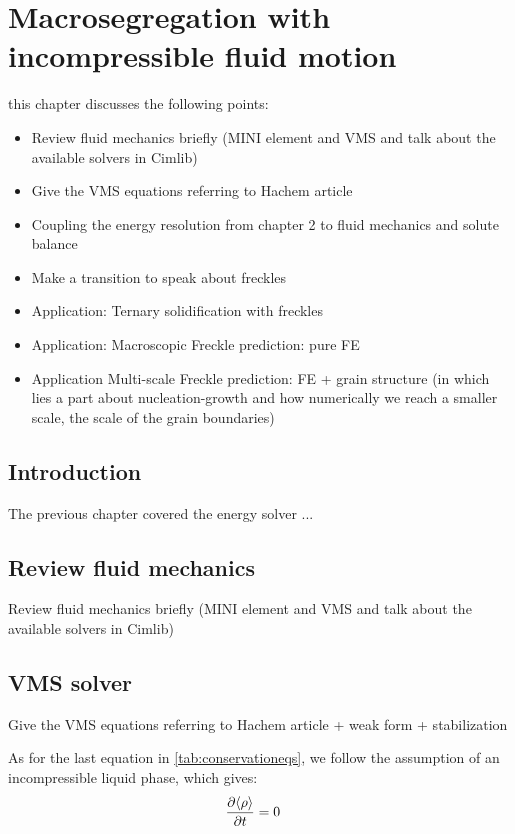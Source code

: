 \chapter{Macrosegregation with incompressible fluid motion}
\begin{nolinkcolors} 
\minitoc
\end{nolinkcolors}
\newpage

this chapter discusses the following points:
\begin{itemize}
\item Review fluid mechanics briefly (MINI element and VMS and talk about the available solvers in Cimlib)
\item Give the VMS equations referring to Hachem article
\item Coupling the energy resolution from chapter 2 to fluid mechanics and solute balance
\item Make a transition to speak about freckles
\item Application: Ternary solidification with freckles
\item Application: Macroscopic Freckle prediction: pure FE
\item Application Multi-scale Freckle prediction: FE + grain structure (in which lies a part about nucleation-growth and how numerically 
		we reach a smaller scale, the scale of the grain boundaries)
\end{itemize}

\section{Introduction}
The previous chapter covered the energy solver ...

\section{Review fluid mechanics}
Review fluid mechanics briefly (MINI element and VMS and talk about the available solvers in Cimlib)

\section{VMS solver}
Give the VMS equations referring to Hachem article + weak form + stabilization

As for the last equation in \cref{tab:conservationeqs}, we follow the assumption of an incompressible liquid phase, which gives:
\begin{align}
\label{eq:incompressiblity}
& \frac{\partial \langle  \rho  \rangle}{\partial t} = 0 
\end{align}

